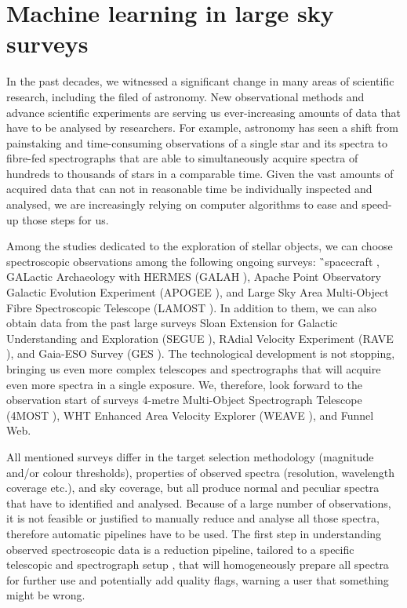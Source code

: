 \section{Machine learning in large sky surveys}
In the past decades, we witnessed a significant change in many areas of scientific research, including the filed of astronomy. New observational methods and advance scientific experiments are serving us ever-increasing amounts of data that have to be analysed by researchers. For example, astronomy has seen a shift from painstaking and time-consuming observations of a single star and its spectra to fibre-fed spectrographs that are able to simultaneously acquire spectra of hundreds to thousands of stars in a comparable time. Given the vast amounts of acquired data that can not in reasonable time be individually inspected and analysed, we are increasingly relying on computer algorithms to ease and speed-up those steps for us.

Among the studies dedicated to the exploration of stellar objects, we can choose spectroscopic observations among the following ongoing surveys: \G\ spacecraft \cite{2016A&A...595A...1G}, GALactic Archaeology with HERMES (GALAH \cite{2017MNRAS.465.3203M}), Apache Point Observatory Galactic Evolution Experiment (APOGEE \cite{2017AJ....154...94M}), and Large Sky Area Multi-Object Fibre Spectroscopic Telescope (LAMOST \cite{2012RAA....12.1197C}). In addition to them, we can also obtain data from the past large surveys Sloan Extension for Galactic Understanding and Exploration (SEGUE \cite{2009AJ....137.4377Y}), RAdial Velocity Experiment (RAVE \cite{2017AJ....153...75K}), and Gaia-ESO Survey (GES \cite{2012Msngr.147...25G}). The technological development is not stopping, bringing us even more complex telescopes and spectrographs that will acquire even more spectra in a single exposure. We, therefore, look forward to the observation start of surveys 4-metre Multi-Object Spectrograph Telescope (4MOST \cite{2012SPIE.8446E..0TD}), WHT Enhanced Area Velocity Explorer (WEAVE \cite{2012SPIE.8446E..0PD}), and Funnel Web.

All mentioned surveys differ in the target selection methodology (magnitude and/or colour thresholds), properties of observed spectra (resolution, wavelength coverage etc.), and sky coverage, but all produce normal and peculiar spectra that have to identified and analysed. Because of a large number of observations, it is not feasible or justified to manually reduce and analyse all those spectra, therefore automatic pipelines have to be used. The first step in understanding observed spectroscopic data is a reduction pipeline, tailored to a specific telescopic and spectrograph setup \cite{2017MNRAS.464.1259K, 2019arXiv191202905A, 2020arXiv200204377S}, that will homogeneously prepare all spectra for further use and potentially add quality flags, warning a user that something might be wrong.


